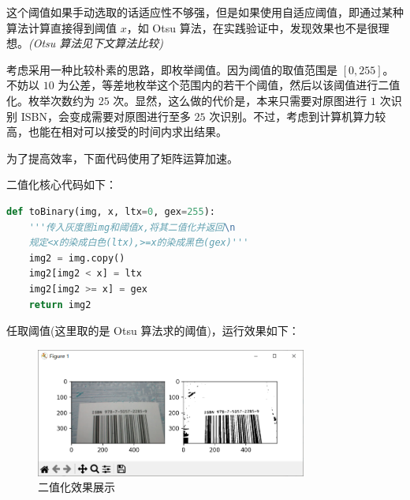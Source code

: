 \documentclass{ctexart}
\begin{document}
这个阈值如果手动选取的话适应性不够强，但是如果使用自适应阈值，即通过某种算法计算直接得到阈值 $x$，如 Otsu 算法，在实践验证中，发现效果也不是很理想。\textit{(Otsu 算法见下文算法比较)}

考虑采用一种比较朴素的思路，即枚举阈值。因为阈值的取值范围是 $[0,255]$。不妨以 $10$ 为公差，等差地枚举这个范围内的若干个阈值，然后以该阈值进行二值化。枚举次数约为 $25$ 次。显然，这么做的代价是，本来只需要对原图进行 $1$ 次识别 ISBN，会变成需要对原图进行至多 $25$ 次识别。不过，考虑到计算机算力较高，也能在相对可以接受的时间内求出结果。

为了提高效率，下面代码使用了矩阵运算加速。

二值化核心代码如下：
\begin{lstlisting}[language=python]
def toBinary(img, x, ltx=0, gex=255):
    '''传入灰度图img和阈值x,将其二值化并返回\n
    规定<x的染成白色(ltx),>=x的染成黑色(gex)'''
    img2 = img.copy()
    img2[img2 < x] = ltx
    img2[img2 >= x] = gex
    return img2
\end{lstlisting}

任取阈值(这里取的是 Otsu 算法求的阈值)，运行效果如下：
\begin{figure}[htbp]
    \centering
    \includegraphics[height=120pt]{sample_toBinary}
    \caption{二值化效果展示}
\end{figure}
\end{document}
